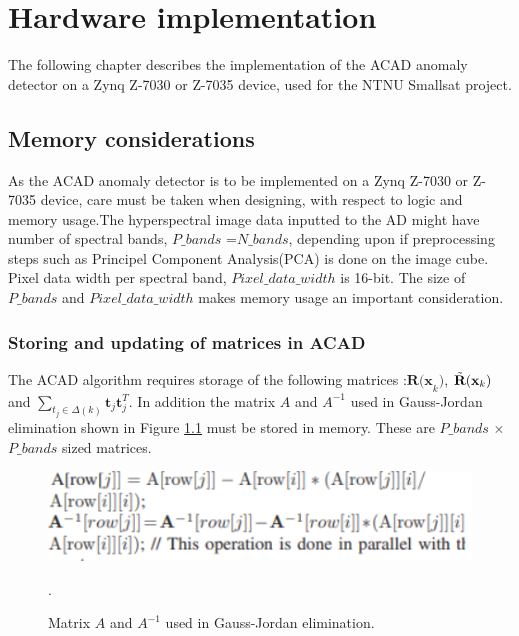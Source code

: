 \newpage
\chapter{Hardware implementation}
\label{sec:implementation}
The following chapter describes the implementation of the ACAD anomaly detector on a Zynq Z-7030 or Z-7035 device, used for the NTNU Smallsat project. \\

\section{Memory considerations}
\label{sec:memory_management}
    As the ACAD anomaly detector is to be implemented on a Zynq Z-7030 or Z-7035 device, care must be taken when designing, with respect to logic and memory usage.The hyperspectral image data inputted to the AD might have number of spectral bands, $P\_bands$ =$N\_bands$, depending upon if preprocessing steps such as Principel Component Analysis(PCA) is done on the image cube. Pixel data width per spectral band, $Pixel\_data\_width$ is 16-bit. The size of $P\_bands$ and $Pixel\_data\_width$ makes memory usage an important consideration.

\subsection{Storing and updating of matrices in ACAD }
\label{sec:mem_management_correlation_matrix}
The ACAD algorithm requires storage of the following matrices :$\textbf{R(x}_k)$, $\Tilde{\textbf{R}}(\textbf{x}_k)$ and $\sum_{t_j\in\Delta(k)}\textbf{t}_j\textbf{t}_j^T$. In addition the matrix $A$ and $A^{-1}$ used in Gauss-Jordan elimination shown in Figure \ref{fig:matrix_A_and} must be stored in memory. These are $P\_bands$ $\times$ $P\_bands$ sized matrices. 

\begin{figure}[H]
\centering                                                              \includegraphics[scale=0.9]{images/matrix_A_and_inv.PNG}
  \caption{Matrix $A$ and $A^{-1}$ used in Gauss-Jordan elimination.} 
  \label{fig:matrix_A_and}.
\end{figure}

